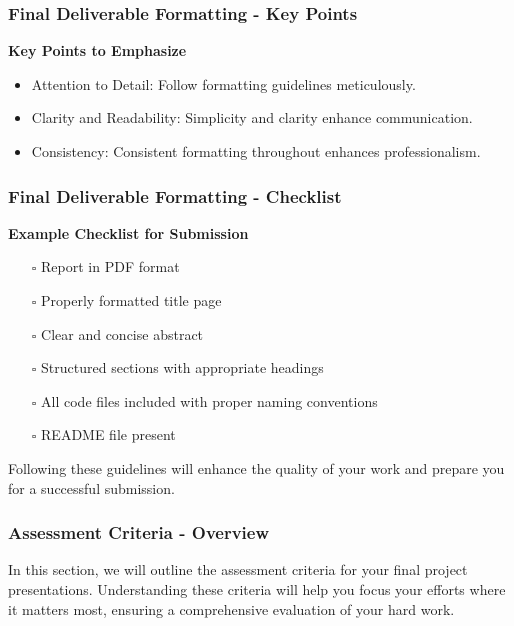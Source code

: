 \documentclass[aspectratio=169]{beamer}
\begin{document}
\begin{frame}[fragile]
    \frametitle{Final Deliverable Formatting - Key Points}
    \textbf{Key Points to Emphasize}
    \begin{itemize}
        \item Attention to Detail: Follow formatting guidelines meticulously.
        \item Clarity and Readability: Simplicity and clarity enhance communication.
        \item Consistency: Consistent formatting throughout enhances professionalism.
    \end{itemize}
\end{frame}

\begin{frame}[fragile]
    \frametitle{Final Deliverable Formatting - Checklist}
    \textbf{Example Checklist for Submission}
    \begin{itemize}
        \item [\(\square\)] Report in PDF format
        \item [\(\square\)] Properly formatted title page
        \item [\(\square\)] Clear and concise abstract
        \item [\(\square\)] Structured sections with appropriate headings
        \item [\(\square\)] All code files included with proper naming conventions
        \item [\(\square\)] README file present
    \end{itemize}
    
    Following these guidelines will enhance the quality of your work and prepare you for a successful submission.
\end{frame}

\begin{frame}
  \frametitle{Assessment Criteria - Overview}
  In this section, we will outline the assessment criteria for your final project presentations. 
  Understanding these criteria will help you focus your efforts where it matters most, ensuring a comprehensive evaluation of your hard work.
\end{frame}
\end{document}
